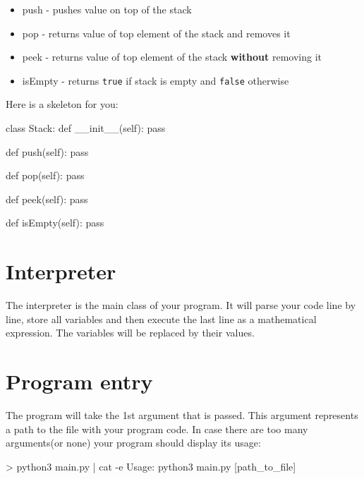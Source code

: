 \documentclass{42-en}
\begin{document}
            \begin{itemize}\itemsep1pt
                \item push - pushes value on top of the stack
                \item pop - returns value of top element of the stack and removes it
                \item peek - returns value of top element of the stack \textbf{without} removing it
                \item isEmpty - returns \texttt{true} if stack is empty and \texttt{false} otherwise
            \end{itemize}
    Here is a skeleton for you: 
\begin{42pycode}
class Stack:
    def __init__(self):
        pass
    
    def push(self):
        pass
    
    def pop(self):
        pass

    def peek(self):
        pass

    def isEmpty(self):
        pass
\end{42pycode}

    \section{Interpreter}

    The interpreter is the main class of your program. It will parse your code line by 
    line, store all variables and then execute the last line as a mathematical 
    expression. The variables will be replaced by their values.

    \section{Program entry}
    
        The program will take the 1st argument that is passed. This argument represents a 
        path to the file with your program code. In case there are too many arguments(or 
        none) your program 
        should display its usage:
        \newline
        \begin{42console}
> python3 main.py | cat -e
Usage: python3 main.py [path_to_file]
\end{42console}
                
\end{document}

